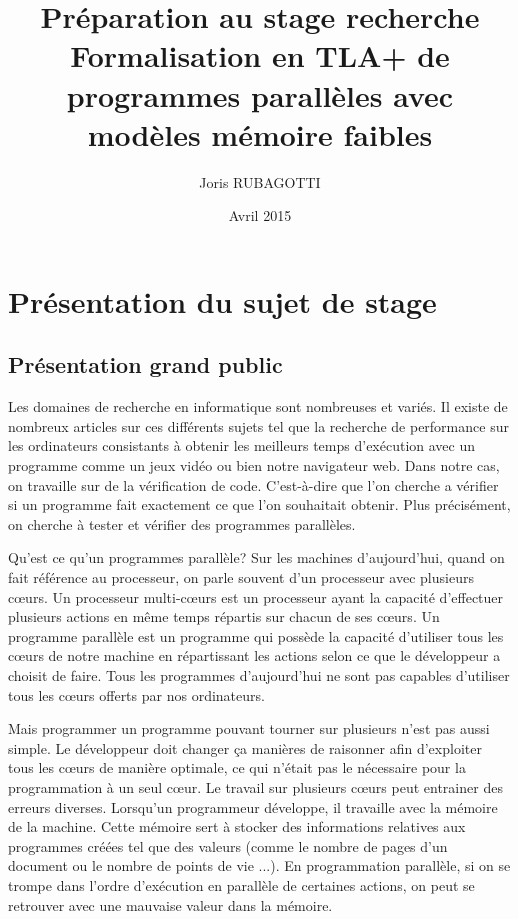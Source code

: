 \documentclass[12pt,a4paper]{article}
\title{Préparation au stage recherche \\ Formalisation en TLA+ de programmes parallèles avec modèles mémoire faibles}
\author{Joris RUBAGOTTI}
\date{Avril 2015}
\begin{document}
\maketitle

\section{Présentation du sujet de stage}

\subsection{Présentation grand public}

Les domaines de recherche en informatique sont nombreuses et variés. Il existe de nombreux articles sur ces différents sujets tel que la recherche de performance sur les ordinateurs consistants à obtenir les meilleurs temps d'exécution avec un programme comme un jeux vidéo ou bien notre navigateur web. Dans notre cas, on travaille sur de la vérification de code. C'est-à-dire que l'on cherche a vérifier si un programme fait exactement ce que l'on souhaitait obtenir. Plus précisément, on cherche à tester et vérifier des programmes parallèles.
 
Qu'est ce qu'un programmes parallèle? Sur les machines d'aujourd'hui, quand on fait référence au processeur, on parle souvent d'un processeur avec plusieurs cœurs. Un processeur multi-cœurs est un processeur ayant la capacité d'effectuer plusieurs actions en même temps répartis sur chacun de ses cœurs. Un programme parallèle est un programme qui possède la capacité d'utiliser tous les cœurs de notre machine en répartissant les actions selon ce que le développeur a choisit de faire. Tous les programmes d'aujourd'hui ne sont pas capables d'utiliser tous les cœurs offerts par nos ordinateurs.

Mais programmer un programme pouvant tourner sur plusieurs n'est pas aussi simple. Le développeur doit changer ça manières de raisonner afin d'exploiter tous les cœurs de manière optimale, ce qui n'était pas le nécessaire pour la programmation à un seul cœur. Le travail sur plusieurs cœurs peut entrainer des erreurs diverses. Lorsqu'un programmeur développe, il travaille avec la mémoire de la machine. Cette mémoire sert à stocker des informations relatives aux programmes créées tel que des valeurs (comme le nombre de pages d'un document ou le nombre de points de vie ...). En programmation parallèle, si on se trompe dans l'ordre d'exécution en parallèle de certaines actions, on peut se retrouver avec une mauvaise valeur dans la mémoire.
\end{document}

